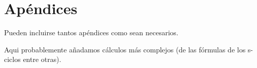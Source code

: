 \chapter{Apéndices}
Pueden incluirse tantos apéndices como sean necesarios.


Aqui probablemente añadamos cálculos más complejos (de las fórmulas de los s-ciclos entre otras).